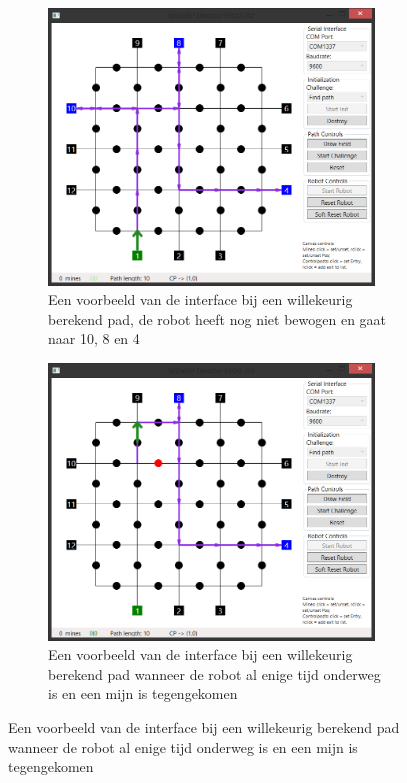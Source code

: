 \documentclass{report}
\begin{document}
\begin{figure}[H]
	\centering
	\begin{subfigure}{0.48\textwidth}
		\centering
		\includegraphics[width=0.95\textwidth]{resource/director-initial-screenshot}
		\caption{Een voorbeeld van de interface bij een willekeurig berekend pad, de robot heeft nog niet bewogen en gaat naar 10, 8 en 4}
		\label{fig:director-initial}
	\end{subfigure}
	\begin{subfigure}{0.48\textwidth}
		\includegraphics[width=0.95\textwidth]{resource/director-ontheway-screenshot}
		\caption{Een voorbeeld van de interface bij een willekeurig berekend pad wanneer de robot al enige tijd onderweg is en een mijn is tegengekomen}
		\label{fig:director-ontheway}
	\end{subfigure}
	\label{fig:director}
\end{figure}
\end{document}
